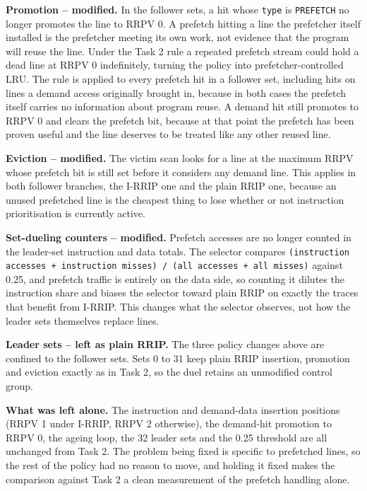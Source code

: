 \documentclass[10pt]{article}
\begin{document}
\textbf{Promotion -- modified.} In the follower sets, a hit whose \texttt{type} is \texttt{PREFETCH} no longer promotes the line to RRPV 0. A prefetch hitting a line the prefetcher itself installed is the prefetcher meeting its own work, not evidence that the program will reuse the line. Under the Task 2 rule a repeated prefetch stream could hold a dead line at RRPV 0 indefinitely, turning the policy into prefetcher-controlled LRU. The rule is applied to every prefetch hit in a follower set, including hits on lines a demand access originally brought in, because in both cases the prefetch itself carries no information about program reuse. A demand hit still promotes to RRPV 0 and clears the prefetch bit, because at that point the prefetch has been proven useful and the line deserves to be treated like any other reused line.

\textbf{Eviction -- modified.} The victim scan looks for a line at the maximum RRPV whose prefetch bit is still set before it considers any demand line. This applies in both follower branches, the I-RRIP one and the plain RRIP one, because an unused prefetched line is the cheapest thing to lose whether or not instruction prioritisation is currently active.

\textbf{Set-dueling counters -- modified.} Prefetch accesses are no longer counted in the leader-set instruction and data totals. The selector compares \texttt{(instruction accesses + instruction misses) / (all accesses + all misses)} against 0.25, and prefetch traffic is entirely on the data side, so counting it dilutes the instruction share and biases the selector toward plain RRIP on exactly the traces that benefit from I-RRIP. This changes what the selector observes, not how the leader sets themselves replace lines.

\textbf{Leader sets -- left as plain RRIP.} The three policy changes above are confined to the follower sets. Sets 0 to 31 keep plain RRIP insertion, promotion and eviction exactly as in Task 2, so the duel retains an unmodified control group.

\textbf{What was left alone.} The instruction and demand-data insertion positions (RRPV 1 under I-RRIP, RRPV 2 otherwise), the demand-hit promotion to RRPV 0, the ageing loop, the 32 leader sets and the 0.25 threshold are all unchanged from Task 2. The problem being fixed is specific to prefetched lines, so the rest of the policy had no reason to move, and holding it fixed makes the comparison against Task 2 a clean measurement of the prefetch handling alone.
\end{document}
